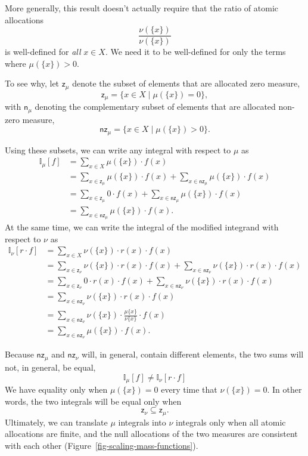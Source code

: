\documentclass[
  letterpaper,
  DIV=11,
  numbers=noendperiod]{scrartcl}
\begin{document}
More generally, this result doesn't actually require that the ratio of
atomic allocations \[
\frac{ \nu(  \{ x \} ) }{ \nu( \{ x \} ) }
\] is well-defined for \emph{all} \(x \in X\). We need it to be
well-defined for only the terms where \(\mu( \{ x \} ) > 0\).

To see why, let \(\mathsf{z}_{\mu}\) denote the subset of elements that
are allocated zero measure, \[
\mathsf{z}_{\mu} = \{ x \in X \mid \mu( \{ x \} ) = 0 \},
\] with \(\mathsf{n}_{\mu}\) denoting the complementary subset of
elements that are allocated non-zero measure, \[
\mathsf{nz}_{\mu} = \{ x \in X \mid \mu( \{ x \} ) > 0 \}.
\]

Using these subsets, we can write any integral with respect to \(\mu\)
as \begin{align*}
\mathbb{I}_{\mu}[f]
&=
\sum_{x \in X} \mu( \{ x \} ) \cdot f(x)
\\
&=
  \sum_{x \in \mathsf{z}_{\mu}} \mu( \{ x \} ) \cdot f(x)
+ \sum_{x \in \mathsf{nz}_{\mu}} \mu( \{ x \} ) \cdot f(x)
\\
&=
  \sum_{x \in \mathsf{z}_{\mu}} 0 \cdot f(x)
+ \sum_{x \in \mathsf{nz}_{\mu}} \mu( \{ x \} ) \cdot f(x)
\\
&=
\sum_{x \in \mathsf{nz}_{\mu}} \mu( \{ x \} ) \cdot f(x).
\end{align*} At the same time, we can write the integral of the modified
integrand with respect to \(\nu\) as \begin{align*}
\mathbb{I}_{\nu} [ r \cdot f ]
&=
\sum_{x \in X} \nu( \{ x \} ) \cdot r(x) \cdot f(x)
\\
&=
  \sum_{x \in \mathsf{z}_{\nu}}
    \nu( \{ x \} ) \cdot r(x) \cdot f(x)
+ \sum_{x \in \mathsf{nz}_{\nu}}
    \nu( \{ x \} ) \cdot r(x) \cdot f(x)
\\
&=
  \sum_{x \in \mathsf{z}_{\nu}}
    0 \cdot r(x) \cdot f(x)
+ \sum_{x \in \mathsf{nz}_{\nu}}
    \nu( \{ x \} ) \cdot r(x) \cdot f(x)
\\
&=
\sum_{x \in \mathsf{nz}_{\nu}}
  \nu( \{ x \} ) \cdot r(x) \cdot f(x)
\\
&=
\sum_{x \in \mathsf{nz}_{\nu}}
  \nu( \{ x \} ) \cdot
  \frac{ \mu \{ x \} }{ \nu \{ x \} } \cdot f(x)
\\
&=
\sum_{x \in \mathsf{nz}_{\nu}} \mu( \{ x \} ) \cdot f(x).
\end{align*}

Because \(\mathsf{nz}_{\mu}\) and \(\mathsf{nz}_{\nu}\) will, in
general, contain different elements, the two sums will not, in general,
be equal, \[
\mathbb{I}_{\mu}[f] \ne
\mathbb{I}_{\nu}
\left[ r \cdot f \right]
\] We have equality only when \(\mu( \{ x \} ) = 0\) every time that
\(\nu( \{ x \} ) = 0\). In other words, the two integrals will be equal
only when \[
\mathsf{z}_{\nu} \subseteq \mathsf{z}_{\mu}.
\] Ultimately, we can translate \(\mu\) integrals into \(\nu\) integrals
only when all atomic allocations are finite, and the null allocations of
the two measures are consistent with each other
(Figure~\ref{fig-scaling-mass-functions}).
\end{document}
